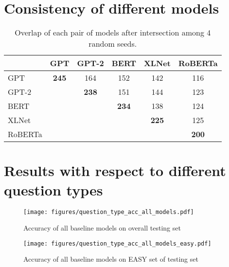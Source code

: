 \documentclass{article} \usepackage{iclr2020_conference,times}
\newcommand\bertbase{BERT\xspace}
\newcommand\xlnetbase{XLNet\xspace}
\newcommand\robertabase{RoBERTa\xspace}
\begin{document}
\section{Consistency of different models}
\label{appendix-consistency-of-different-models}
\begin{table}[ht]
	\small
	\caption{Overlap of each pair of models after intersection among 4 random seeds.}
	\label{tab:Overlap}
	\begin{center}
		\begin{tabular}{l|ccccc}
			 & \multicolumn{1}{c}{GPT}  &\multicolumn{1}{c}{GPT-2} &\multicolumn{1}{c}{\bertbase} &\multicolumn{1}{c}{\xlnetbase} &\multicolumn{1}{c}{\robertabase}\\
			\hline
			GPT &           \bf 245 & 164       & 152       & 142       & 116\\
			GPT-2 &                 & \bf 238   & 151       & 144       & 123\\
			\bertbase &             &           & \bf 234   & 138       & 124 \\
			\xlnetbase &            &           &           & \bf 225   & 125\\
			\robertabase &          &           &           &           & \bf 200\\

		\end{tabular}
	\end{center}
\end{table}
\newpage
\section{Results with respect to different question types}
\label{appendix-results-with-respect-to-different-question-types}
	\begin{figure}[ht]
		\begin{center}
\texttt{[image: figures/question\_type\_acc\_all\_models.pdf]}
		\end{center}
		\caption{Accuracy of all baseline models on overall testing set}
		\label{fig:question_type_acc_all_models}
	\end{figure}
	
	\begin{figure}[htbp]
		\begin{center}
\texttt{[image: figures/question\_type\_acc\_all\_models\_easy.pdf]}
		\end{center}
		\caption{Accuracy of all baseline models on EASY set of testing set}
		\label{fig:question_type_acc_all_models_easy}
	\end{figure}
	
\end{document}
